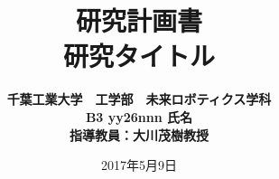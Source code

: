 \documentclass[uplatex,twocolumn]{jsarticle}
\begin{document}
\title{\normalsize 研究計画書\\ \Huge \bf 研究タイトル}
\author{\bf 千葉工業大学　工学部　未来ロボティクス学科\\ B3 yy26nnn 氏名\\ \small 指導教員：大川茂樹教授}
\date{2017年5月9日}%
\maketitle






\end{document}
